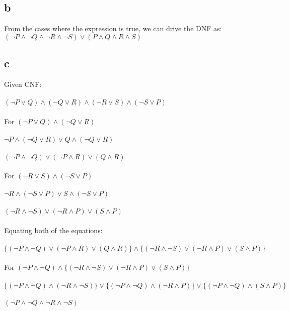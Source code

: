\documentclass{article}
\begin{document}
    \subsection{\textbf{b}}
    From the cases where the expression is true, we can drive the DNF as:\\
    $(\neg P \land \neg Q \land \neg R \land \neg S) \lor (P \land Q \land R \land S)$\\
    \subsection{\textbf{c}}
    Given CNF:\\
    \\
    $(\neg P \lor Q) \land (\neg Q \lor R) \land (\neg R \lor S) \land (\neg S \lor P)$\\
    \\
    For $(\neg P \lor Q) \land (\neg Q \lor R)$\\
    \\
    $\neg P \land (\neg Q \lor R) \lor Q \land (\neg Q \lor R)$\\
    \\
    $(\neg P \land \neg Q) \lor (\neg P \land R) \lor (Q \land R)$\\
    \\
    For $(\neg R \lor S) \land (\neg S \lor P)$\\
    \\
    $\neg R \land (\neg S \lor P) \lor S \land (\neg S \lor P)$\\
    \\
    $(\neg R \land \neg S) \lor (\neg R \land P) \lor (S \land P)$\\
    \\
    Equating both of the equations:\\
    \\
    $\{(\neg P \land \neg Q) \lor (\neg P \land R) \lor (Q \land R)\} \land \{(\neg R \land \neg S) \lor (\neg R \land P) \lor (S \land P)\}$\\
    \\
    For  $(\neg P \land \neg Q)\land \{(\neg R \land \neg S) \lor (\neg R \land P) \lor (S \land P)\}$ \\
    \\
    $\{(\neg P \land \neg Q) \land (\neg R \land \neg S)\} \lor \{(\neg P \land \neg Q) \land (\neg R \land P)\} \lor \{(\neg P \land \neg Q) \land (S \land P)\}$\\
    \\
    $(\neg P \land \neg Q \land \neg R \land \neg S)$\\
\end{document}
